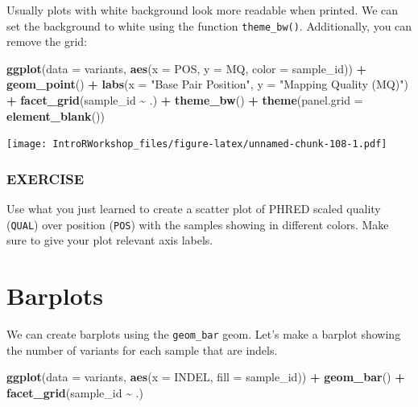 \documentclass[
]{book}
\newenvironment{Shaded}{\begin{snugshade}}{\end{snugshade}}
\newcommand{\AttributeTok}[1]{\textcolor[rgb]{0.13,0.29,0.53}{#1}}
\newcommand{\FunctionTok}[1]{\textcolor[rgb]{0.13,0.29,0.53}{\textbf{#1}}}
\newcommand{\NormalTok}[1]{#1}
\newcommand{\SpecialCharTok}[1]{\textcolor[rgb]{0.81,0.36,0.00}{\textbf{#1}}}
\newcommand{\StringTok}[1]{\textcolor[rgb]{0.31,0.60,0.02}{#1}}
\begin{document}
Usually plots with white background look more readable when printed. We can set the background to white using the function \texttt{theme\_bw()}. Additionally, you can remove the grid:

\begin{Shaded}
\begin{Highlighting}[]
\FunctionTok{ggplot}\NormalTok{(}\AttributeTok{data =}\NormalTok{ variants, }\FunctionTok{aes}\NormalTok{(}\AttributeTok{x =}\NormalTok{ POS, }\AttributeTok{y =}\NormalTok{ MQ, }\AttributeTok{color =}\NormalTok{ sample\_id)) }\SpecialCharTok{+}
  \FunctionTok{geom\_point}\NormalTok{() }\SpecialCharTok{+}
  \FunctionTok{labs}\NormalTok{(}\AttributeTok{x =} \StringTok{"Base Pair Position"}\NormalTok{,}
       \AttributeTok{y =} \StringTok{"Mapping Quality (MQ)"}\NormalTok{) }\SpecialCharTok{+}
  \FunctionTok{facet\_grid}\NormalTok{(sample\_id }\SpecialCharTok{\textasciitilde{}}\NormalTok{ .) }\SpecialCharTok{+}
  \FunctionTok{theme\_bw}\NormalTok{() }\SpecialCharTok{+}
  \FunctionTok{theme}\NormalTok{(}\AttributeTok{panel.grid =} \FunctionTok{element\_blank}\NormalTok{())}
\end{Highlighting}
\end{Shaded}

\texttt{[image: IntroRWorkshop\_files/figure-latex/unnamed-chunk-108-1.pdf]}

\subsubsection*{EXERCISE}\label{exercise-4}

Use what you just learned to create a scatter plot of PHRED scaled quality (\texttt{QUAL}) over position (\texttt{POS}) with the samples showing in different colors. Make sure to give your plot relevant axis labels.

\section{Barplots}\label{barplots}

We can create barplots using the \texttt{geom\_bar} geom. Let's make a barplot showing the number of variants for each sample that are indels.

\begin{Shaded}
\begin{Highlighting}[]
\FunctionTok{ggplot}\NormalTok{(}\AttributeTok{data =}\NormalTok{ variants, }\FunctionTok{aes}\NormalTok{(}\AttributeTok{x =}\NormalTok{ INDEL, }\AttributeTok{fill =}\NormalTok{ sample\_id)) }\SpecialCharTok{+}
  \FunctionTok{geom\_bar}\NormalTok{() }\SpecialCharTok{+}
  \FunctionTok{facet\_grid}\NormalTok{(sample\_id }\SpecialCharTok{\textasciitilde{}}\NormalTok{ .)}
\end{Highlighting}
\end{Shaded}
\end{document}
